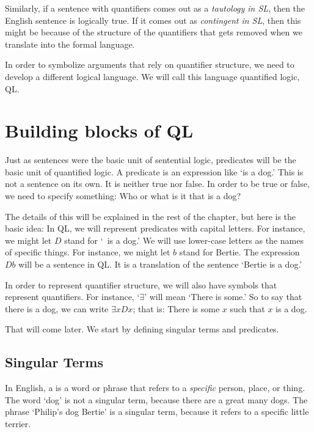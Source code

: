 
Similarly, if a sentence with quantifiers comes out as a \emph{tautology in SL}, then the English sentence is logically true. If it comes out as \emph{contingent in SL}, then this might be because of the structure of the quantifiers that gets removed when we translate into the formal language.


In order to symbolize arguments that rely on quantifier structure, we need to develop a different logical language. We will call this language quantified logic, QL.


\section{Building blocks of QL}

Just as sentences were the basic unit of sentential logic, predicates will be the basic unit of quantified logic. A predicate is an expression like `is a dog.' This is not a sentence on its own. It is neither true nor false. In order to be true or false, we need to specify something: Who or what is it that is a dog?

The details of this will be explained in the rest of the chapter, but here is the basic idea: In QL, we will represent predicates with capital letters. For instance, we might let $D$ stand for `\blank\ is a dog.' We will use lower-case letters as the names of specific things. For instance, we might let $b$ stand for Bertie. The expression $Db$ will be a sentence in QL. It is a translation of the sentence `Bertie is a dog.'

In order to represent quantifier structure, we will also have symbols that represent quantifiers. For instance, `$\exists$' will mean `There is some\blank.' So to say that there is a dog, we can write $\exists x Dx$; that is: There is some $x$ such that $x$ is a dog.

That will come later. We start by defining singular terms and predicates.


\subsection{Singular Terms}
In English, a  is a word or phrase that refers to a \emph{specific} person, place, or thing. The word `dog' is not a singular term, because there are a great many dogs. The phrase `Philip's dog Bertie' is a singular term, because it refers to a specific little terrier.

